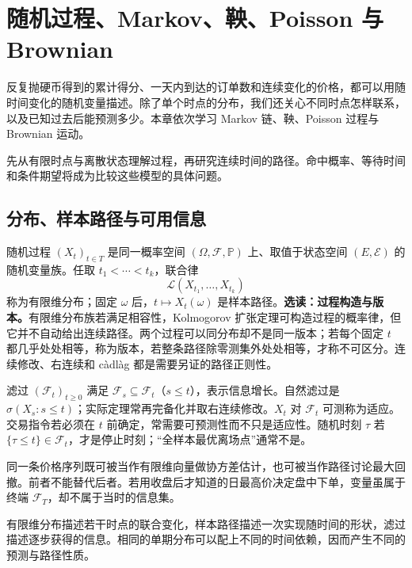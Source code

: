 \chapter{随机过程、Markov、鞅、Poisson 与 Brownian}
\label{ch:stochastic-processes}

反复抛硬币得到的累计得分、一天内到达的订单数和连续变化的价格，都可以用随时间变化的随机变量描述。除了单个时点的分布，我们还关心不同时点怎样联系，以及已知过去后能预测多少。本章依次学习 Markov 链、鞅、Poisson 过程与 Brownian 运动。

先从有限时点与离散状态理解过程，再研究连续时间的路径。命中概率、等待时间和条件期望将成为比较这些模型的具体问题。

\section{分布、样本路径与可用信息}

随机过程 $(X_t)_{t\in T}$ 是同一概率空间 $(\Omega,\mathcal F,\mathbb P)$ 上、取值于状态空间 $(E,\mathcal E)$ 的随机变量族。任取 $t_1<\cdots<t_k$，联合律
\[
  \mathcal L(X_{t_1},\ldots,X_{t_k})
\]
称为有限维分布；固定 $\omega$ 后，$t\mapsto X_t(\omega)$ 是样本路径。\textbf{选读：过程构造与版本。}有限维分布族若满足相容性，Kolmogorov 扩张定理可构造过程的概率律，但它并不自动给出连续路径。两个过程可以同分布却不是同一版本；若每个固定 $t$ 都几乎处处相等，称为版本，若整条路径除零测集外处处相等，才称不可区分。连续修改、右连续和 càdlàg 都是需要另证的路径正则性。



滤过 $(\mathcal F_t)_{t\ge0}$ 满足 $\mathcal F_s\subseteq\mathcal F_t$（$s\le t$），表示信息增长。自然滤过是 $\sigma(X_s:s\le t)$；实际定理常再完备化并取右连续修改。$X_t$ 对 $\mathcal F_t$ 可测称为适应。交易指令若必须在 $t$ 前确定，常需要可预测性而不只是适应性。随机时刻 $\tau$ 若 $\{\tau\le t\}\in\mathcal F_t$，才是停止时刻；“全样本最优离场点”通常不是。


\begin{example}[信息层次]
同一条价格序列既可被当作有限维向量做协方差估计，也可被当作路径讨论最大回撤。前者不能替代后者。若用收盘后才知道的日最高价决定盘中下单，变量虽属于终端 $\mathcal F_T$，却不属于当时的信息集。
\end{example}

有限维分布描述若干时点的联合变化，样本路径描述一次实现随时间的形状，滤过描述逐步获得的信息。相同的单期分布可以配上不同的时间依赖，因而产生不同的预测与路径性质。


